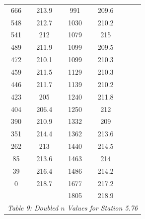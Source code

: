 \begin{center}
\begin{tabular}{|cc||cc||cc|}
    666      & 213.9                     & 991  & 209.6                          &          &                                     \\
    548      & 212.7                     & 1030 & 210.2                          &          &                                     \\
    541      & 212                       & 1079 & 215                            &          &                                     \\
    489      & 211.9                     & 1099 & 209.5                          &          &                                     \\
    472      & 210.1                     & 1099 & 210.3                          &          &                                     \\
    459      & 211.5                     & 1129 & 210.3                          &          &                                     \\
    446      & 211.7                     & 1139 & 210.2                          &          &                                     \\
    423      & 205                       & 1240 & 211.8                          &          &                                     \\
    404      & 206.4                     & 1250 & 212                            &          &                                     \\
    390      & 210.9                     & 1332 & 209                            &          &                                     \\
    351      & 214.4                     & 1362 & 213.6                          &          &                                     \\
    262      & 213                       & 1440 & 214.5                          &          &                                     \\
    85       & 213.6                     & 1463 & 214                            &          &                                     \\
    39       & 216.4                     & 1486 & 214.2                          &          &                                     \\
    0        & 218.7                     & 1677 & 217.2                          &          &                                     \\
             &                           & 1805 & 218.9                          &          &                                     \\
    \hline\multicolumn{6}{c}{\emph{Table 9: Doubled $n$ Values for Station 5.76}}
\end{tabular}


\end{center}
